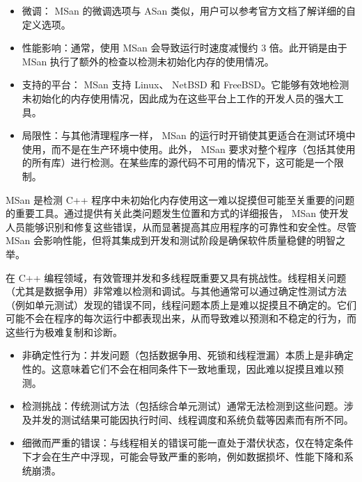 \begin{itemize}
\item
微调： MSan 的微调选项与 ASan 类似，用户可以参考官方文档了解详细的自定义选项。

\item
性能影响：通常，使用 MSan 会导致运行时速度减慢约 3 倍。此开销是由于 MSan 执行了额外的检查以检测未初始化内存的使用情况。

\item
支持的平台： MSan 支持 Linux、 NetBSD 和 FreeBSD。它能够有效地检测未初始化的内存使用情况，因此成为在这些平台上工作的开发人员的强大工具。

\item
局限性：与其他清理程序一样， MSan 的运行时开销使其更适合在测试环境中使用，而不是在生产环境中使用。此外， MSan 要求对整个程序（包括其使用的所有库）进行检测。在某些库的源代码不可用的情况下，这可能是一个限制。
\end{itemize}

MSan 是检测 C++ 程序中未初始化内存使用这一难以捉摸但可能至关重要的问题的重要工具。通过提供有关此类问题发生位置和方式的详细报告， MSan 使开发人员能够识别和修复这些错误，从而显著提高其应用程序的可靠性和安全性。尽管 MSan 会影响性能，但将其集成到开发和测试阶段是确保软件质量稳健的明智之举。


在 C++ 编程领域，有效管理并发和多线程既重要又具有挑战性。线程相关问题（尤其是数据争用）非常难以检测和调试。与其他通常可以通过确定性测试方法（例如单元测试）发现的错误不同，线程问题本质上是难以捉摸且不确定的。它们可能不会在程序的每次运行中都表现出来，从而导致难以预测和不稳定的行为，而这些行为极难复制和诊断。


\begin{itemize}
\item
非确定性行为：并发问题（包括数据争用、死锁和线程泄漏）本质上是非确定性的。这意味着它们不会在相同条件下一致地重现，因此难以捉摸且难以预测。

\item
检测挑战：传统测试方法（包括综合单元测试）通常无法检测到这些问题。涉及并发的测试结果可能因执行时间、线程调度和系统负载等因素而有所不同。

\item
细微而严重的错误：与线程相关的错误可能一直处于潜伏状态，仅在特定条件下才会在生产中浮现，可能会导致严重的影响，例如数据损坏、性能下降和系统崩溃。
\end{itemize}

